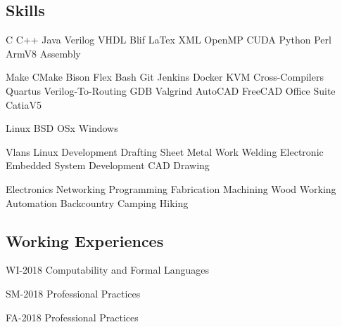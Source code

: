 \documentclass[]{deedy-resume-openfont}
\begin{document}
\begin{flushleft}
\begin{samepage}
\end{samepage}

\begin{samepage}
\section{Skills}

C \textbullet{} 
C++ \textbullet{}
Java \textbullet{}
Verilog \textbullet{}
VHDL \textbullet{}
Blif \textbullet{}
LaTex \textbullet{}
XML \textbullet{}
OpenMP \textbullet{}
CUDA \textbullet{}
Python \textbullet{}
Perl \textbullet{}
ArmV8 Assembly
\sectionsep 

Make \textbullet{}
CMake \textbullet{}
Bison \textbullet{}
Flex \textbullet{}
Bash \textbullet{}
Git \textbullet{}
Jenkins \textbullet{}
Docker \textbullet{}
KVM \textbullet{}
Cross-Compilers \textbullet{}
Quartus \textbullet{}
Verilog-To-Routing \textbullet{}
GDB \textbullet{}
Valgrind \textbullet{}
AutoCAD \textbullet{}
FreeCAD \textbullet{}
Office Suite \textbullet{}
CatiaV5
\sectionsep

Linux \textbullet{}
BSD \textbullet{}
OSx \textbullet{}
Windows
\sectionsep

Vlans \textbullet{}
Linux Development \textbullet{}
Drafting \textbullet{}
Sheet Metal Work \textbullet{}
Welding \textbullet{}
Electronic \textbullet{}
Embedded System Development \textbullet{}
CAD Drawing
\sectionsep

Electronics \textbullet{}
Networking \textbullet{} 
Programming \textbullet{} 
Fabrication \textbullet{} 
Machining \textbullet{} 
Wood Working \textbullet{} 
Automation \textbullet{} 
Backcountry Camping \textbullet{} 
Hiking \textbullet{} 
\sectionsep
\end{samepage}


\begin{samepage}
\section{Working Experiences}

\vspace{\topsep} %
\begin{tightemize}
\item WI-2018 Computability and Formal Languages
\item SM-2018 Professional Practices
\item FA-2018 Professional Practices
\end{tightemize}
\sectionsep
\end{samepage}


\end{flushleft}
\end{document}
